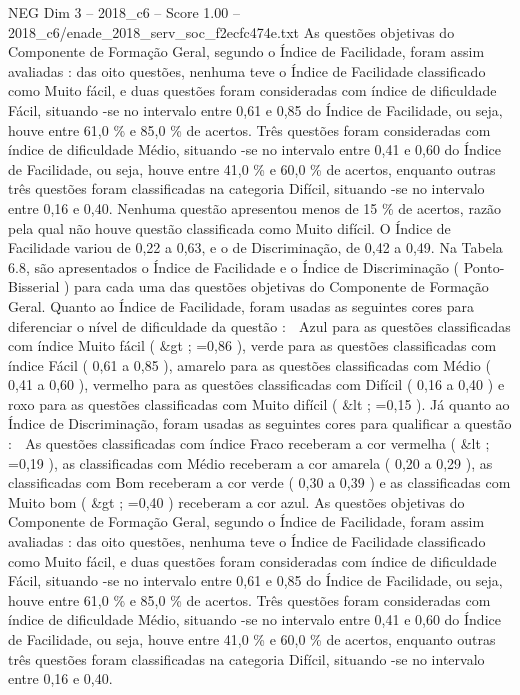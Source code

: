 \begin{textsample}{NEG Dim 3 – 2018\_c6 – Score 1.00 – 2018\_c6/enade\_2018\_serv\_soc\_f2ecfc474e.txt}
As questões objetivas do Componente de Formação Geral, segundo o Índice de Facilidade, foram assim avaliadas : das oito questões, nenhuma teve o Índice de Facilidade classificado como Muito fácil, e duas questões foram consideradas com índice de dificuldade Fácil, situando -se no intervalo entre 0,61 e 0,85 do Índice de Facilidade, ou seja, houve entre 61,0 \% e 85,0 \% de acertos.
Três questões foram consideradas com índice de dificuldade Médio, situando -se no intervalo entre 0,41 e 0,60 do Índice de Facilidade, ou seja, houve entre 41,0 \% e 60,0 \% de acertos, enquanto outras três questões foram classificadas na categoria Difícil, situando -se no intervalo entre 0,16 e 0,40.
Nenhuma questão apresentou menos de 15 \% de acertos, razão pela qual não houve questão classificada como Muito difícil.
O Índice de Facilidade variou de 0,22 a 0,63, e o de Discriminação, de 0,42 a 0,49.
Na Tabela 6.8, são apresentados o Índice de Facilidade e o Índice de Discriminação ( Ponto-Bisserial ) para cada uma das questões objetivas do Componente de Formação Geral.
Quanto ao Índice de Facilidade, foram usadas as seguintes cores para diferenciar o nível de dificuldade da questão :  Azul para as questões classificadas com índice Muito fácil ( \&gt ; =0,86 ), verde para as questões classificadas com índice Fácil ( 0,61 a 0,85 ), amarelo para as questões classificadas com Médio ( 0,41 a 0,60 ), vermelho para as questões classificadas com Difícil ( 0,16 a 0,40 ) e roxo para as questões classificadas com Muito difícil ( \&lt ; =0,15 ).
Já quanto ao Índice de Discriminação, foram usadas as seguintes cores para qualificar a questão :  As questões classificadas com índice Fraco receberam a cor vermelha ( \&lt ; =0,19 ), as classificadas com Médio receberam a cor amarela ( 0,20 a 0,29 ), as classificadas com Bom receberam a cor verde ( 0,30 a 0,39 ) e as classificadas com Muito bom ( \&gt ; =0,40 ) receberam a cor azul.
As questões objetivas do Componente de Formação Geral, segundo o Índice de Facilidade, foram assim avaliadas : das oito questões, nenhuma teve o Índice de Facilidade classificado como Muito fácil, e duas questões foram consideradas com índice de dificuldade Fácil, situando -se no intervalo entre 0,61 e 0,85 do Índice de Facilidade, ou seja, houve entre 61,0 \% e 85,0 \% de acertos.
Três questões foram consideradas com índice de dificuldade Médio, situando -se no intervalo entre 0,41 e 0,60 do Índice de Facilidade, ou seja, houve entre 41,0 \% e 60,0 \% de acertos, enquanto outras três questões foram classificadas na categoria Difícil, situando -se no intervalo entre 0,16 e 0,40.

\end{textsample}
